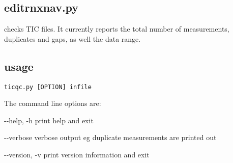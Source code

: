 \subsection{editrnxnav.py}

\hypertarget{h:ticqc}{}

 checks TIC files. It currently reports the total number of measurements, duplicates and gaps,
as well the data range.

\subsection{usage}

\begin{lstlisting}[mathescape=true]
ticqc.py [OPTION] infile
\end{lstlisting}
The command line options are:
\begin{description*}
\item[-{}-help, -h] print help and exit
\item[-{}-verbose ] verbose output eg duplicate measurements are printed out
\item[-{}-version, -v] print version information and exit
\end{description*}

